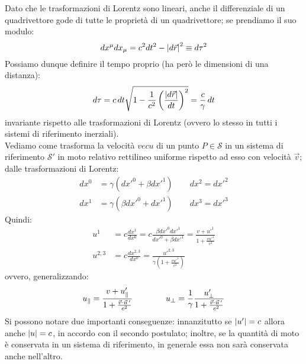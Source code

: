 \documentclass[]{article}
\begin{document}
Dato che le trasformazioni di Lorentz sono lineari, anche il differenziale di un quadrivettore gode di tutte le proprietà di un quadrivettore; se prendiamo il suo modulo:
\begin{equation}
	dx^{\mu}dx_{\mu} = c^2dt^2 - \left\lvert d\vec{r}\right\rvert^2 \equiv d\tau^2
	\label{eq:11}
\end{equation}
Possiamo dunque definire il tempo proprio (ha però le dimensioni di una distanza):
\begin{equation}
	d\tau = c \,dt \sqrt{1 - \displaystyle\frac{1}{c^2}\left(\displaystyle\frac{\left\lvert d\vec{r}\right\rvert}{dt}\right)^2} = \displaystyle\frac{c}{\gamma}\,dt
	\label{eq:12}
\end{equation}
invariante rispetto alle trasformazioni di Lorentz (ovvero lo stesso in tutti i sistemi di riferimento inerziali). \\ 
%
Vediamo come trasforma la velocità $ vec{u} $ di un punto $ P \in \mathcal{S} $ in un sistema di riferimento $ \mathcal{S}' $ in moto relativo rettilineo uniforme rispetto ad esso con velocità $ \vec{v} $; dalle trasformazioni di Lorentz:
\begin{equation}
	\begin{split}
		dx^0 &= \gamma (dx'^0 + \beta dx'^1) \qquad dx^2 = dx'^2 \\ 
		dx^1 &= \gamma (\beta dx'^0 + dx'^1) \qquad dx^3 = dx'^3
	\end{split}
	\label{eq:13}
\end{equation}
Quindi:
\begin{equation}
	\begin{split}
		u^1 &= c \displaystyle\frac{dx^1}{dx^0} = c \displaystyle\frac{\beta dx'^0 dx'^1}{dx'^0 + \beta dx'^1} = \displaystyle\frac{v + u'^1}{1 + \frac{vu'^1}{c^2}} \\ 
		u^{2,3} &= c \displaystyle\frac{dx^{2,3}}{dx^0} = \displaystyle\frac{u'^{2,3}}{\gamma (1 + \frac{vu'^1}{c^2})}
	\end{split}
	\label{eq:14}
\end{equation}
ovvero, generalizzando:
\begin{equation}
	u_{\parallel} = \displaystyle\frac{v + u'_{\parallel}}{1 + \frac{\vec{v}\cdot\vec{u}\,'}{c^2}} \qquad\qquad u_{\perp} = \displaystyle\frac{1}{\gamma}\displaystyle\frac{u'_{\perp}}{1 + \frac{\vec{v}\cdot\vec{u}\,'}{c^2}}
	\label{eq:15}
\end{equation}
Si possono notare due importanti conseguenze: innanzitutto se $ \left\lvert u'\right\rvert = c $ allora anche $ \left\lvert u\right\rvert = c $, in accordo con il secondo postulato; inoltre, se la quantità di moto è conservata in un sistema di riferimento, in generale essa non sarà conservata anche nell'altro. \\ 
\end{document}
